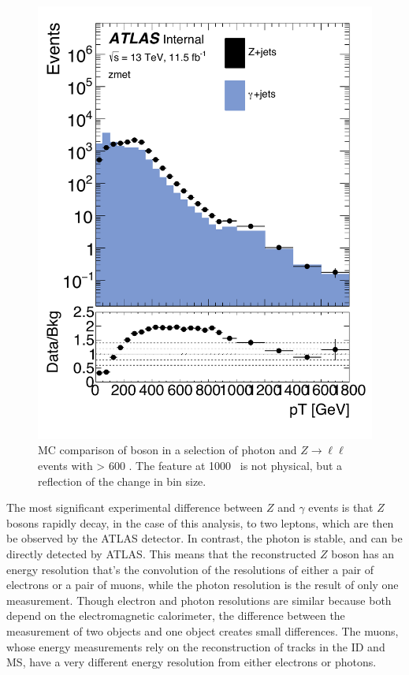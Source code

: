 \begin{centering}
\begin{figure}[!hbt]
\myfloatalign
\includegraphics[width=.85\linewidth]{figures/photons/MC_hist_pt_0_SF_2j_2016_mcmetl___zmet_edit.pdf}
\caption{\ac{MC} comparison of boson \pt in a selection of photon and $Z\rightarrow\ell\ell$ events with \HT > 600 \gev. The feature at 1000 \gev~is not physical, but a reflection of the change in bin size. }
\label{fig:photon_ptdist}
\end{figure}
\end{centering}

The most significant experimental difference between $Z$ and $\gamma$ events is that $Z$ bosons rapidly decay, in the case of this analysis, to two leptons, which are then be observed by the \ac{ATLAS} detector. In contrast, the photon is stable, and can be directly detected by \ac{ATLAS}. This means that the reconstructed $Z$ boson has an energy resolution that's the convolution of the resolutions of either a pair of electrons or a pair of muons, while the photon resolution is the result of only one measurement. Though electron and photon resolutions are similar because both depend on the electromagnetic calorimeter, the difference between the measurement of two objects and one object creates small differences. The muons, whose energy measurements rely on the reconstruction of tracks in the \ac{ID} and \ac{MS}, have a very different energy resolution from either electrons or photons. 

